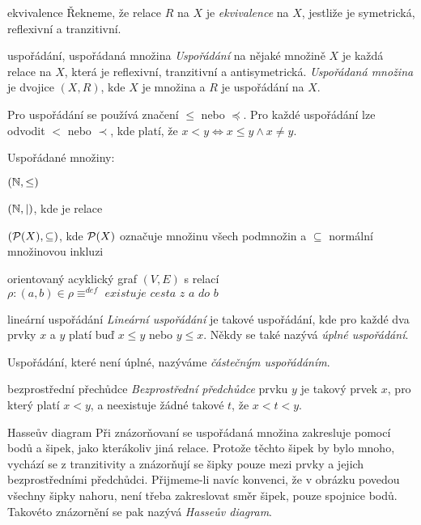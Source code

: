 \begin{definiceN}{ekvivalence}
Řekneme, že relace $R$ na $X$ je \emph{ekvivalence} na $X$, jestliže je symetrická, reflexivní a tranzitivní.
\end{definiceN}

\begin{definiceN}{uspořádání, uspořádaná množina}
\emph{Uspořádání} na nějaké množině $X$ je každá relace na $X$, která je reflexivní, tranzitivní a antisymetrická. \emph{Uspořádaná množina} je dvojice $(X,R)$, kde $X$ je množina a $R$ je uspořádání na $X$.

Pro uspořádání se používá značení $\le$ nebo $\preceq$. Pro každé uspořádání lze odvodit  $<$ nebo $\prec$, kde platí, že $x<y \Leftrightarrow x \le y \wedge x \neq y$.
\end{definiceN}

\begin{priklady}
Uspořádané množiny:
\begin{pitemize}
    \item $(\mathbb{N},\leq)$
    \item $(\mathbb{N},|)$, kde \uv{$|$} je relace 
    \item $(\mathcal{P}(X),\subseteq)$, kde $\mathcal{P}(X)$ označuje množinu všech podmnožin a $\subseteq$ normální množinovou inkluzi
    \item orientovaný acyklický graf $(V,E)$ s relací $\rho:(a,b)\in\rho \equiv^{def} \textit{ existuje cesta z }a\textit{ do }b $
\end{pitemize}
\end{priklady}

\begin{definiceN}{lineární uspořádání}
\emph{Lineární uspořádání} je takové uspořádání, kde pro každé dva prvky $x$ a $y$ platí buď $x \leq y$ nebo $y \leq x$. Někdy se také nazývá \emph{úplné uspořádání}.

Uspořádání, které není úplné, nazýváme \emph{částečným uspořádáním}.
\end{definiceN}

\begin{definiceN}{bezprostřední přechůdce}
\emph{Bezprostřední předchůdce} prvku $y$ je takový prvek $x$, pro který platí $x < y$, a neexistuje žádné takové $t$, že $x < t < y$.
\end{definiceN}

\begin{poznamkaN}{Hasseův diagram}
Při znázorňovaní se uspořádaná množina zakresluje pomocí bodů a šipek, jako kterákoliv jiná relace. Protože těchto šipek by bylo mnoho, vychází se z tranzitivity a znázorňují se šipky pouze mezi prvky a jejich bezprostředními předchůdci. Přijmeme-li navíc konvenci, že v obrázku povedou všechny šipky nahoru, není třeba zakreslovat směr šipek, pouze spojnice bodů. Takovéto znázornění se pak nazývá \emph{Hasseův diagram}.
\end{poznamkaN}

